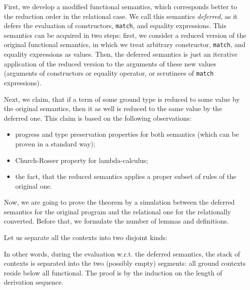 First, we develop a modified functional semantics, which corresponds better to the reduction
order in the relational case. We call this semantics \emph{deferred}, as it defers the evaluation
of constructors, \lstinline|match|, and equality expressions. This semantics can be acquired in
two steps: first, we consider a reduced version of the original functional semantics, in which
we treat arbitrary constructor, \lstinline|match|, and equality expressions as values. Then, the
deferred semantics is just an iterative application of the reduced version to the arguments 
of these new values (arguments of constructors or equality operator, or scrutinees of \lstinline|match| 
expressions).

Next, we claim, that if a term of some ground type is reduced to some value by the original semantics,
then it as well is reduced to the same value by the deferred one. This claim is based on the following
observations:

\begin{itemize}
\item progress and type preservation properties for both semantics (which can be proven in a standard
way);
\item Church-Rosser property for lambda-calculus;
\item the fact, that the reduced semantics applies a proper subset of rules of the original one.
\end{itemize}

Now, we are going to prove the theorem by a simulation between the deferred semantics for the original program
and the relational one for the relationally converted. Before that, we formulate the number of lemmas and 
definitions.

\begin{lemma}
\label{stack_split}
\normalfont Let us separate all the contexts into two disjoint kinds: 


In other words, during the evaluation w.r.t. the deferred semantics, the stack of contexts is separated into the two
(possibly empty) segments: all ground contexts reside below all functional. The proof is by the induction on the
length of derivation sequence.
\end{lemma}

